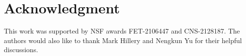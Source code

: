 \section*{Acknowledgment}
This work was supported by NSF awards FET-2106447 and CNS-2128187.
The authors would also like to thank Mark Hillery and Nengkun Yu for their helpful discussions.

